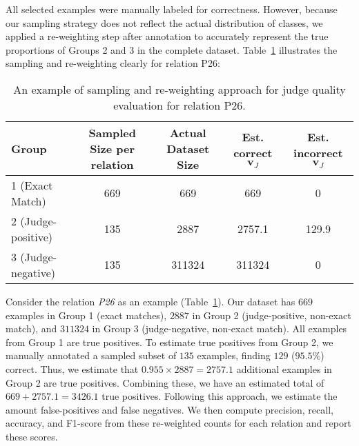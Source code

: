All selected examples were manually labeled for correctness. However, because our sampling strategy does not reflect the actual distribution of classes, we applied a re-weighting step after annotation to accurately represent the true proportions of Groups 2 and 3 in the complete dataset. Table~\ref{tab:group_sampling} illustrates the sampling and re-weighting clearly for relation P26:

\begin{table}[h]
\centering
\small
\begin{tabular}{lcccc}
\toprule
\textbf{Group} & \textbf{Sampled Size per relation} & \textbf{Actual Dataset Size} & \textbf{Est. correct $\mathbf{v}_J$} & \textbf{Est. incorrect $\mathbf{v}_J$} \\
\midrule
1 (Exact Match) & 669 & 669 & 669 & 0 \\
2 (Judge-positive) & 135 & 2887 & 2757.1 & 129.9 \\
3 (Judge-negative) & 135 & 311324 & 311324 & 0 \\
\bottomrule
\end{tabular}
\caption{An example of sampling and re-weighting approach for judge quality evaluation for relation P26.}
\label{tab:group_sampling}
\end{table}

Consider the relation \textit{P26} as an example (Table~\ref{tab:group_sampling}). Our dataset has $669$ examples in Group 1 (exact matches), $2887$ in Group 2 (judge-positive, non-exact match), and $311324$ in Group 3 (judge-negative, non-exact match). 
All examples from Group 1 are true positives. To estimate true positives from Group 2, we manually annotated a sampled subset of $135$ examples, finding $129$ ($95.5\%$) correct. Thus, we estimate that $0.955 \times 2887 = 2757.1$ additional examples in Group 2 are true positives. Combining these, we have an estimated total of $669 + 2757.1 = 3426.1$ true positives.
Following this approach, we estimate the amount false-positives and false negatives. We then  compute precision, recall, accuracy, and F1-score from these re-weighted counts for each relation and report these scores. 


